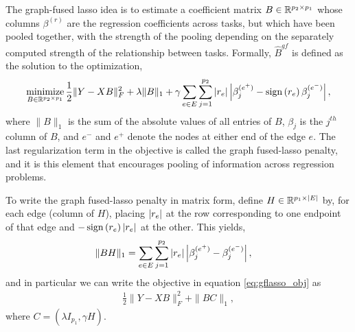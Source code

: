 \documentclass[14pt]{extarticle}
\begin{document}
The graph-fused lasso idea is to estimate a coefficient matrix $B \in
\mathbb{R}^{p_{2} \times p_{1}}$ whose columns $\beta^{(r)}$ are the regression
coefficients across tasks, but which have been pooled together, with the
strength of the pooling depending on the separately computed strength of the
relationship between tasks. Formally, $\hat{B}^{gf}$ is defined as the solution
to the optimization,
\begin{align}
\mathop\mathrm{minimize}_{B \in \mathbb{R}^{p_{2} \times p_{1}}} \frac{1}{2}\|Y -
  XB\|_{F}^{2} + \lambda \|B\|_{1} + \gamma \sum_{e \in E} \sum_{j =
    1}^{p_{2}} \left|r_{e}\right|\left|\beta_{j}^{(e^{+})} -
      \mathop\mathrm{sign}\left(r_{e}\right) \beta^{(e^{-})}_{j}\right|, \label{eq:gflasso_obj}
\end{align}
where $\|B\|_{1}$ is the sum of the absolute values of all entries of $B$,
$\beta_j$ is the $j^{th}$ column of $B$, and $e^{-}$ and $e^{+}$ denote the
nodes at either end of the edge $e$. The last regularization term in the
objective is called the graph fused-lasso penalty, and it is this element that
encourages pooling of information across regression problems.

To write the graph fused-lasso penalty in matrix form, define $H \in
\mathbb{R}^{p_{1} \times \left|E\right|}$ by, for each edge (column of $H$), placing
$\left|r_{e}\right|$ at the row corresponding to one endpoint of that edge and
$-\mathop\mathrm{sign}\left(r_{e}\right)\left|r_{e}\right|$ at the other. This yields,
\begin{align*}
\|BH\|_{1} &= \sum_{e \in E}\sum_{j = 1}^{p_{2}}
\left|r_{e}\right|\left|\beta_{j}^{(e^{+})} - \beta_{j}^{(e^{-})}\right|,
\end{align*}
and in particular we can write the objective in equation \ref{eq:gflasso_obj} as
\begin{align}
  \frac{1}{2}\|Y - XB\|_{F}^{2} + \|BC\|_{1}, \label{eq:gflasso_reform}
\end{align}
where $C = \left(\lambda I_{p_{1}}, \gamma H\right)$.
\end{document}
